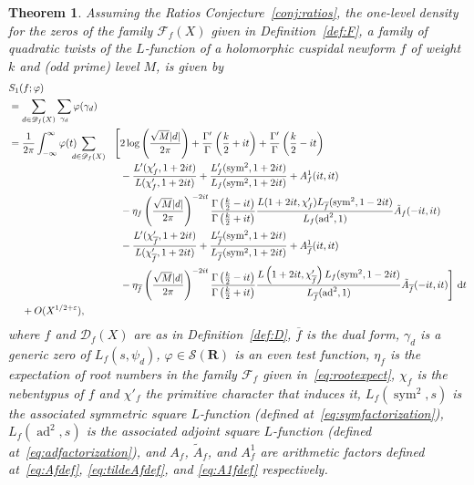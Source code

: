 \documentclass[11pt,reqno]{amsart} \usepackage{fullpage}
\newtheorem{theorem}[lemma]{Theorem}
\newcommand{\R}{\ensuremath{\mathbf{R}}}
\newcommand{\F}{\ensuremath{\mathbf{F}}}
\newcommand{\vep}{\varepsilon}
\renewcommand{\d}[1]{\,\operatorname*{d}\!{#1}}
\newcommand\be{\begin{equation}}
\newcommand\ee{\end{equation}}
\newcommand{\Lchi}[2][]{L(#2,\chi_f#1)}
\newcommand{\Lchibar}[2][]{L\left(#2,\chi_{\overline f}#1\right)}
\DeclareMathOperator{\sym}{sym}
\DeclareMathOperator{\ad}{ad}
\newcommand{\D}{\mathcal D_f}
\renewcommand{\F}{\mathcal F_f}
\numberwithin{equation}{section}
\begin{document}
\begin{theorem}\label{thm:oneleveldensity}
  Assuming the Ratios Conjecture~\ref{conj:ratios}, the one-level density for
  the zeros of the family
  $\F(X)$ given in Definition~\ref{def:F}, a family of quadratic twists of the
  $L$-function of a holomorphic cuspidal newform $f$ of weight $k$ and (odd prime) level
  $M$, is given by
  \be\label{eq:densitythm}\begin{aligned}
    &S_1(f;\varphi) \\ &=\sum_{d\in\D(X)}
    \sum_{\gamma_d}\varphi(\gamma_d) \\
    &=\begin{aligned}[t]
      &\frac1{2\pi}\int_{-\infty}^\infty \varphi(t)\;
      \sum_{\mathclap{\substack{d\in\D(X)\\\ }}}\;\;\;\;\;\;
      \begin{aligned}[t]\Bigg[
        &2\log\left(\frac{\sqrt M|d|}{2\pi}\right)
        +\frac{\Gamma'}{\Gamma}\left(\frac k2+it\right)
        +\frac{\Gamma'}{\Gamma}\left(\frac k2-it\right) \\
        &-\frac{L'(\chi'_f,1+2it)}{L(\chi'_f,1+2it)}
        +\frac{L'_f(\sym^2,1+2it)}{L_f(\sym^2,1+2it)}+A_f^1(it,it) \\
        &-\eta_f\left(\frac{\sqrt M |d|}{2\pi}\right)^{-2it}
        \frac{\Gamma\left(\frac k2-it\right)}{\Gamma\left(\frac k2+it\right)}
        \frac{\Lchi[']{1+2it}L_{\overline f}(\sym^2,1-2it)}
        {L_f(\ad^2,1)}\tilde{A}_f(-it,it) \\
        &-\frac{L'(\chi'_{\overline f},1+2it)}{L(\chi'_{\overline f},1+2it)}
        +\frac{L'_{\overline f}(\sym^2,1+2it)}
        {L_{\overline f}(\sym^2,1+2it)}+A_{\overline f}^1(it,it) \\
        &-\eta_{\overline f}\left(\frac{\sqrt M |d|}{2\pi}\right)^{-2it}
        \frac{\Gamma\left(\frac k2-it\right)}{\Gamma\left(\frac k2+it\right)}
        \frac{\Lchibar[']{1+2it}L_f(\sym^2,1-2it)}
        {L_{\overline f}(\ad^2,1)}\tilde{A}_{\overline f}(-it,it)
        \Bigg] \d t\end{aligned} \\
      &+O(X^{1/2+\vep}),\end{aligned}
  \end{aligned}\ee
  where $f$ and $\D(X)$ are as in Definition~\ref{def:D}, $\overline f$ is the dual form,
  $\gamma_d$ is a generic zero of $L_f(s,\psi_d)$, $\varphi\in\mathcal S(\R)$ is an even
  test function, $\eta_f$ is the expectation of root numbers in the family $\F$ given
  in~\eqref{eq:rootexpect}, $\chi_f$
  is the nebentypus of $f$ and $\chi'_f$ the primitive character that induces it,
  $L_f(\sym^2,s)$ is the associated symmetric square $L$-function (defined
  at~\eqref{eq:symfactorization}), $L_f(\ad^2,s)$ is the associated adjoint square
  $L$-function (defined at~\eqref{eq:adfactorization}), and $A_f$, $\tilde A_f$, and
  $A^1_f$ are arithmetic factors defined at~\eqref{eq:Afdef},
  \eqref{eq:tildeAfdef}, and \eqref{eq:A1fdef} respectively.
\end{theorem}
\end{document}
